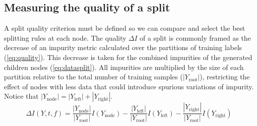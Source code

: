 %


\subsection{Measuring the quality of a split}
\label{sec:criteria}

A split quality criterion must be defined so we can compare and select the best splitting rules at each node. The quality $\Delta I$ of a split is commonly framed as the decrease of an impurity metric calculated over the partitions of training labels (\autoref{eq:quality}). This decrease is taken for the combined impurities of the generated children nodes (\autoref{eq:datasplit}).
All impurities are multiplied by the size of each partition relative to the total number of training samples ($|Y_\text{root}|$), restricting the effect of nodes with less data that could introduce spurious variations of impurity. Notice that $|Y_\text{node}|=|Y_\text{left}|+|Y_\text{right}|$.
%
\begin{equation}
    \Delta I(Y, t, f) =
        \frac{|Y_\text{node}|}{|Y_\text{root}|} I(Y_\text{node})
        - \frac{|Y_\text{left}|}{|Y_\text{root}|} I(Y_\text{left})
        - \frac{|Y_\text{right}|}{|Y_\text{root}|} I(Y_\text{right})
    \label{eq:quality}
\end{equation}

